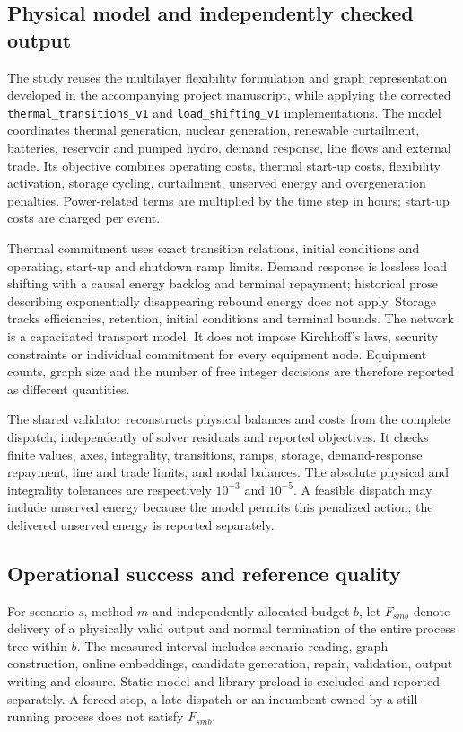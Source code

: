 \subsection{Physical model and independently checked output}
The study reuses the multilayer flexibility formulation and graph representation
developed in the accompanying project manuscript, while applying the corrected
\texttt{thermal\_transitions\_v1} and \texttt{load\_shifting\_v1} implementations.
The model coordinates thermal generation, nuclear generation, renewable
curtailment, batteries, reservoir and pumped hydro, demand response, line flows
and external trade. Its objective combines operating costs, thermal start-up
costs, flexibility activation, storage cycling, curtailment, unserved energy
and overgeneration penalties. Power-related terms are multiplied by the time
step in hours; start-up costs are charged per event.

Thermal commitment uses exact transition relations, initial conditions and
operating, start-up and shutdown ramp limits. Demand response is lossless load
shifting with a causal energy backlog and terminal repayment; historical prose
describing exponentially disappearing rebound energy does not apply. Storage
tracks efficiencies, retention, initial conditions and terminal bounds. The
network is a capacitated transport model. It does not impose Kirchhoff's laws,
security constraints or individual commitment for every equipment node.
Equipment counts, graph size and the number of free integer decisions are
therefore reported as different quantities.

The shared validator reconstructs physical balances and costs from the complete
dispatch, independently of solver residuals and reported objectives. It checks
finite values, axes, integrality, transitions, ramps, storage, demand-response
repayment, line and trade limits, and nodal balances. The absolute physical and
integrality tolerances are respectively $10^{-3}$ and $10^{-5}$. A feasible
dispatch may include unserved energy because the model permits this penalized
action; the delivered unserved energy is reported separately.

\subsection{Operational success and reference quality}
For scenario $s$, method $m$ and independently allocated budget $b$, let
$F_{smb}$ denote delivery of a physically valid output and normal termination
of the entire process tree within $b$. The measured interval includes scenario
reading, graph construction, online embeddings, candidate generation, repair,
validation, output writing and closure. Static model and library preload is
excluded and reported separately. A forced stop, a late dispatch or an incumbent
owned by a still-running process does not satisfy $F_{smb}$.

